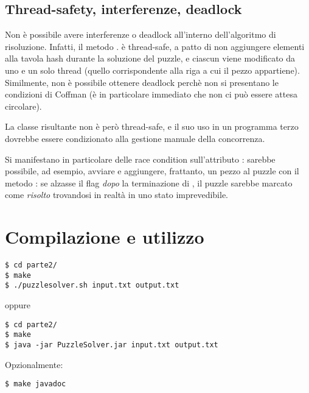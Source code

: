 \documentclass[a4paper]{article}
\begin{document}
\subsection{Thread-safety, interferenze, deadlock}
Non \`e possibile avere interferenze o deadlock all'interno dell'algoritmo di risoluzione.
Infatti, il metodo . \`e thread-safe, a patto di non aggiungere elementi alla tavola hash durante la soluzione del puzzle, e ciascun  viene modificato da uno e un solo thread (quello corrispondente alla riga a cui il pezzo appartiene).
Similmente, non \`e possibile ottenere deadlock perch\`e non si presentano le condizioni di Coffman (\`e in particolare immediato che non ci pu\`o essere attesa circolare).

La classe risultante non \`e per\`o thread-safe, e il suo uso in un programma terzo dovrebbe essere condizionato alla gestione manuale della concorrenza.

Si manifestano in particolare delle race condition sull'attributo : sarebbe possibile, ad esempio, avviare  e aggiungere, frattanto, un pezzo al puzzle con il metodo : se  alzasse il flag  \emph{dopo} la terminazione di , il puzzle sarebbe marcato come \emph{risolto} trovandosi in realt\`a in uno stato imprevedibile.

\section{Compilazione e utilizzo}
\begin{verbatim}
$ cd parte2/ 
$ make
$ ./puzzlesolver.sh input.txt output.txt
\end{verbatim}
oppure
\begin{verbatim}
$ cd parte2/ 
$ make
$ java -jar PuzzleSolver.jar input.txt output.txt
\end{verbatim}

Opzionalmente:
\begin{verbatim}
$ make javadoc
\end{verbatim}


{}

\end{document}
